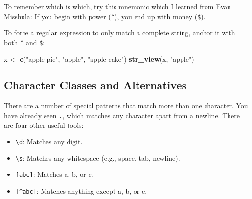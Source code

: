 \documentclass[]{book}
\newenvironment{Shaded}{\begin{snugshade}}{\end{snugshade}}
\newcommand{\KeywordTok}[1]{\textcolor[rgb]{0.13,0.29,0.53}{\textbf{#1}}}
\newcommand{\StringTok}[1]{\textcolor[rgb]{0.31,0.60,0.02}{#1}}
\newcommand{\NormalTok}[1]{#1}
\providecommand{\tightlist}{%
  \setlength{\itemsep}{0pt}\setlength{\parskip}{0pt}}
\begin{document}
\hypertarget{htmlwidget-36aa3d2a04d42bbc2145}{}

\begin{Shaded}
\end{Shaded}

\hypertarget{htmlwidget-febe03efa1a2d8d52a86}{}

To remember which is which, try this mnemonic which I learned from
\href{https://twitter.com/emisshula/status/323863393167613953}{Evan
Misshula}: If you begin with power (\texttt{\^{}}), you end up with
money (\texttt{\$}).

To force a regular expression to only match a complete string, anchor it
with both \texttt{\^{}} and \texttt{\$}:

\begin{Shaded}
\begin{Highlighting}[]
\NormalTok{x <-}\StringTok{ }\KeywordTok{c}\NormalTok{(}\StringTok{"apple pie"}\NormalTok{, }\StringTok{"apple"}\NormalTok{, }\StringTok{"apple cake"}\NormalTok{)}
\KeywordTok{str_view}\NormalTok{(x, }\StringTok{"apple"}\NormalTok{)}
\end{Highlighting}
\end{Shaded}

\hypertarget{htmlwidget-1fb4450895fe099f74a1}{}

\begin{Shaded}
\end{Shaded}

\hypertarget{htmlwidget-10b3b7155e8045a1b2ad}{}

\subsection{Character Classes and
Alternatives}\label{character-classes-and-alternatives}

There are a number of special patterns that match more than one
character. You have already seen \texttt{.}, which matches any character
apart from a newline. There are four other useful tools:

\begin{itemize}
\tightlist
\item
  \texttt{\textbackslash{}d}: Matches any digit.
\item
  \texttt{\textbackslash{}s}: Matches any whitespace (e.g., space, tab,
  newline).
\item
  \texttt{{[}abc{]}}: Matches a, b, or c.
\item
  \texttt{{[}\^{}abc{]}}: Matches anything except a, b, or c.
\end{itemize}
\end{document}
